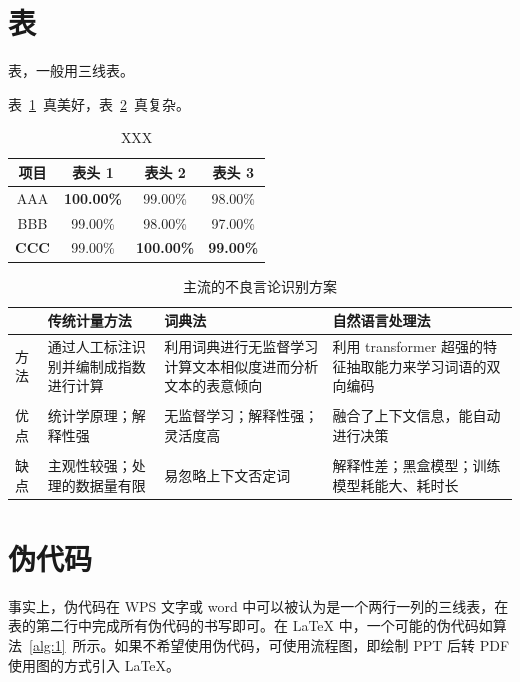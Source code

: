 \documentclass[14pt]{jnuthesis}
\begin{document}
\section{表}

表，一般用三线表。

表~\ref{tab:compare}~真美好，表~\ref{tab:complex}~真复杂。

\begin{table}[htbp]
	\caption{XXX}
	\centering %
	\begin{tabular}{cccc}
		\hline
		\textbf{项目} & \textbf{表头 1} & \textbf{表头 2} & \textbf{表头 3}  \\
		\hline
		AAA & \textbf{100.00\%} & 99.00\% & 98.00\%  \\
		BBB & 99.00\% & 98.00\% & 97.00\%  \\
		\textbf{CCC} & 99.00\% & \textbf{100.00\%} & \textbf{99.00\%}  \\
		\hline
	\end{tabular}
	\label{tab:compare}
\end{table}

\begin{table}[htbp]
	\caption{主流的不良言论识别方案}
	\centering
	\begin{tabular}{m{1cm}m{4.1cm}m{4.4cm}m{4.3cm}}
		\hline
		 & \textbf{传统计量方法} & \textbf{词典法} & \textbf{自然语言处理法}\upcite{b3-2-3-2}  \\
		\hline
		方法 & 通过人工标注识别并编制成指数进行计算 & 利用词典进行无监督学习计算文本相似度进而分析文本的表意倾向 & 利用 transformer 超强的特征抽取能力来学习词语的双向编码  \\
		 &  &  &  \\
		优点 & 统计学原理；解释性强 & 无监督学习；解释性强；灵活度高 & 融合了上下文信息，能自动进行决策  \\
		 &  &  &  \\
		缺点 & 主观性较强；处理的数据量有限 & 易忽略上下文否定词 & 解释性差；黑盒模型；训练模型耗能大、耗时长  \\
		\hline
	\end{tabular}
	\label{tab:complex}
\end{table}

\section{伪代码}

事实上，伪代码在 WPS 文字或 word 中可以被认为是一个两行一列的三线表，在表的第二行中完成所有伪代码的书写即可。在 LaTeX 中，一个可能的伪代码如算法~\ref{alg:1}~所示。如果不希望使用伪代码，可使用流程图，即绘制 PPT 后转 PDF 使用图的方式引入 LaTeX。
\end{document}
